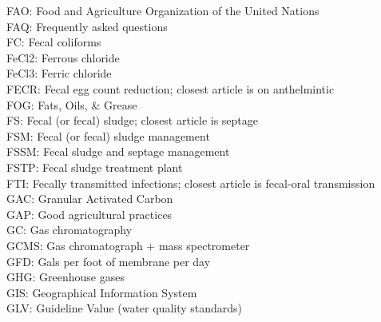 \documentclass{article}
\begin{document}
FAO:  Food and Agriculture Organization of the United Nations
\vspace{0.3cm}\\
FAQ:  Frequently asked questions
\vspace{0.3cm}\\
FC:  Fecal coliforms
\vspace{0.3cm}\\
FeCl2: Ferrous chloride
\vspace{0.3cm}\\
FeCl3:  Ferric chloride
\vspace{0.3cm}\\
FECR:  Fecal egg count reduction; closest article is on anthelmintic
\vspace{0.3cm}\\
FOG: Fats, Oils, \& Grease
\vspace{0.3cm}\\
FS:  Fecal (or fecal) sludge; closest article is septage
\vspace{0.3cm}\\
FSM:  Fecal (or fecal) sludge management
\vspace{0.3cm}\\
FSSM:  Fecal sludge and septage management
\vspace{0.3cm}\\
FSTP:  Fecal sludge treatment plant
\vspace{0.3cm}\\
FTI:  Fecally transmitted infections; closest article is fecal-oral transmission
\vspace{0.3cm}\\
GAC:  Granular Activated Carbon
\vspace{0.3cm}\\
GAP:  Good agricultural practices
\vspace{0.3cm}\\
GC:  Gas chromatography
\vspace{0.3cm}\\
GCMS:  Gas chromatograph + mass spectrometer
\vspace{0.3cm}\\
GFD:  Gals per foot of membrane per day 
\vspace{0.3cm}\\
GHG:  Greenhouse gases
\vspace{0.3cm}\\
GIS:  Geographical Information System
\vspace{0.3cm}\\
GLV:  Guideline Value (water quality standards)
\end{document}
